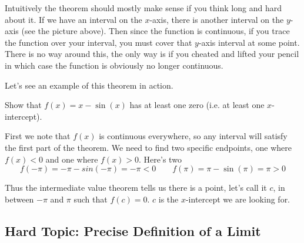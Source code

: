 Intuitively the theorem should mostly make sense if you think long and hard about it. If we have an interval on the $x$-axis, there is another interval on the $y$-axis (see the picture above). Then since the function is continuous, if you trace the function over your interval, you must cover that $y$-axis interval at some point. There is no way around this, the only way is if you cheated and lifted your pencil in which case the function is obviously no longer continuous.

Let's see an example of this theorem in action.
\begin{example}
	Show that $f(x) = x - \sin(x)$ has at least one zero (i.e. at least one $x$-intercept). 
	
	First we note that $f(x)$ is continuous everywhere, so any interval will satisfy the first part of the theorem. We need to find two specific endpoints, one where $f(x) < 0$ and one where $f(x) > 0$. Here's two
	\[ f(-\pi) = -\pi - sin(-\pi) = -\pi < 0 \qquad f(\pi) = \pi - \sin(\pi) = \pi > 0 \]
	
	Thus the intermediate value theorem tells us there is a point, let's call it $c$, in between $-\pi$ and $\pi$ such that $f(c) = 0$. $c$ is the $x$-intercept we are looking for.
\end{example}

\newpage 
\subsection{Hard Topic: Precise Definition of a Limit}

